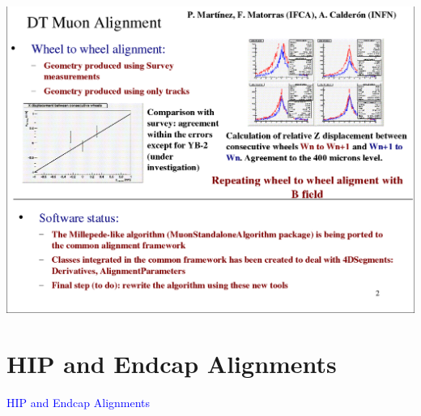 \documentclass[compress]{beamer}
\begin{document}
\begin{frame}
\mbox{\hspace{-1 cm}\includegraphics[width=1.2\linewidth]{Pablo2.png}}
\end{frame}

\section*{HIP and Endcap Alignments}
\begin{frame}
\begin{center}
\Huge \textcolor{blue}{HIP and Endcap Alignments}
\end{center}
\end{frame}
\end{document}
